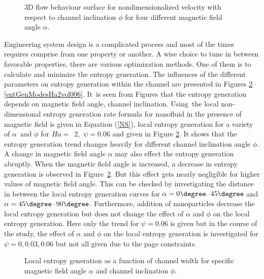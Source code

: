 \begin{figure}
\centerline{}
\vspace*{6mm}
\caption{3D flow behaviour surface for nondimensionalized velocity with respect to channel inclination $\phi$ for four different magnetic field angle $\alpha$.}
\label{vel_3DHa2vol003} 
\end{figure}




Engineering system design is a complicated process and most of the times requires comprise from one property or another. A wise choice to tune in between favorable properties, there are various optimization methods. One of them is to calculate and minimize the entropy generation. 
The influences of the different parameters on entropy generation within the channel are presented in Figures \ref{localEntGenHa2vol006}--\ref{entGenModesHa2vol006}. It~is seen from Figures that the entropy generation depends on magnetic field angle, channel inclination.
Using~the local non-dimensional entropy generation rate formula for nanofluid in the presence of magnetic field is given in Equation (\ref{NS}), local entropy generation for a variety of $\alpha$~and $\phi$ for \mbox{$Ha =$ 2, }$\psi = 0.06$ and given in Figure \ref{localEntGenHa2vol006}. It shows that the entropy generation trend changes heavily for different channel inclination angle $\phi$. A change in magnetic field angle $\alpha$ may also effect the entropy generation abruptly. When the magnetic field angle is increased, a decrease in entropy generation is observed in Figure~\ref{localEntGenHa2vol006}. But this effect gets nearly negligible for higher values of magnetic field angle. This can be checked by investigating the distance in between the local entropy generation curves for $\alpha = 0\degree$--$45\degree$ and $\alpha = 45\degree$--$90\degree$. Furthermore, addition of nanoparticles decrease the local entropy generation but does not change the effect of $\alpha$ and $\phi$ on the local entropy generation. Here only the trend for $\psi = 0.06$ is given but  in the course of the study, the effect of $\alpha$ and $\phi$ on the local entropy generation is investigated for $\psi = 0, 0.03, 0.06$ but not all given due to the page constraints.  %

\begin{figure}
\centerline{}
\vspace*{5mm}
\caption{Local entropy generation as a function of channel width for specific magnetic field angle $\alpha$ and  channel inclination $\phi$.}
\label{localEntGenHa2vol006} 
\end{figure}


